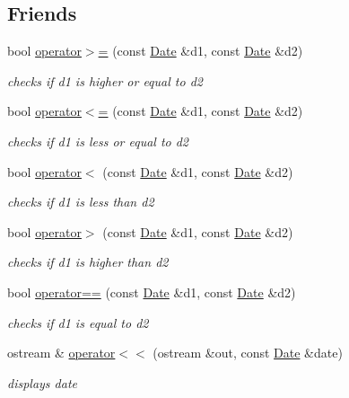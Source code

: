 \subsection*{Friends}
\begin{DoxyCompactItemize}
\item 
bool \hyperlink{class_date_a9aae61020a07731a50cc80927fd8d346}{operator$>$=} (const \hyperlink{class_date}{Date} \&d1, const \hyperlink{class_date}{Date} \&d2)
\begin{DoxyCompactList}\small\item\em checks if d1 is higher or equal to d2 \end{DoxyCompactList}\item 
bool \hyperlink{class_date_a4f314b2216e8760eac284385a7eaae12}{operator$<$=} (const \hyperlink{class_date}{Date} \&d1, const \hyperlink{class_date}{Date} \&d2)
\begin{DoxyCompactList}\small\item\em checks if d1 is less or equal to d2 \end{DoxyCompactList}\item 
bool \hyperlink{class_date_a5a3f411cbd59e9ecb90b2f8e6aaea551}{operator$<$} (const \hyperlink{class_date}{Date} \&d1, const \hyperlink{class_date}{Date} \&d2)
\begin{DoxyCompactList}\small\item\em checks if d1 is less than d2 \end{DoxyCompactList}\item 
bool \hyperlink{class_date_a5c40ea6f65fef5d3e1ed8bec5e16ec41}{operator$>$} (const \hyperlink{class_date}{Date} \&d1, const \hyperlink{class_date}{Date} \&d2)
\begin{DoxyCompactList}\small\item\em checks if d1 is higher than d2 \end{DoxyCompactList}\item 
bool \hyperlink{class_date_a18dc8aca1ca4d8cadc2b464db984135b}{operator==} (const \hyperlink{class_date}{Date} \&d1, const \hyperlink{class_date}{Date} \&d2)
\begin{DoxyCompactList}\small\item\em checks if d1 is equal to d2 \end{DoxyCompactList}\item 
ostream \& \hyperlink{class_date_a5c29d00ecf33e6d232a410f1f3d6eb70}{operator$<$$<$} (ostream \&out, const \hyperlink{class_date}{Date} \&date)
\begin{DoxyCompactList}\small\item\em displays date \end{DoxyCompactList}\end{DoxyCompactItemize}


